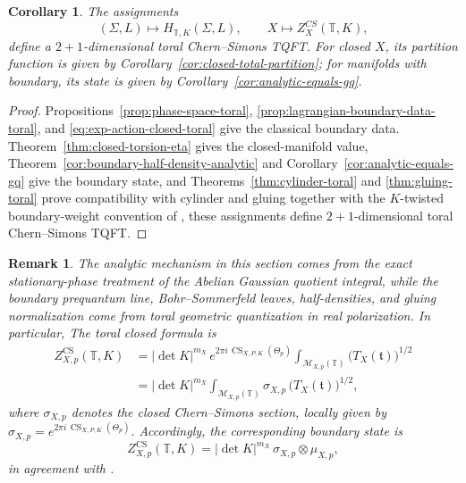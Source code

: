 \documentclass[12pt]{amsart}
\numberwithin{equation}{section}
\newtheorem{corollary}[theorem]{Corollary}
\newtheorem*{remark}{Remark}
\begin{document}
\begin{corollary}
The assignments
\[
(\Sigma, L)\longmapsto H_{\mathbb T,K}(\Sigma,L), \qquad
X\longmapsto Z^{CS}_X(\mathbb T,K),
\]
define a \(2+1\)-dimensional toral Chern--Simons TQFT. For closed \(X\), its partition
function is given by Corollary~\ref{cor:closed-total-partition}; for manifolds with boundary, its state is given by
Corollary~\ref{cor:analytic-equals-gq}.
\end{corollary}

\begin{proof}
Propositions~\ref{prop:phase-space-toral}, \ref{prop:lagrangian-boundary-data-toral}, and \ref{eq:exp-action-closed-toral} give the classical boundary data. Theorem~\ref{thm:closed-torsion-eta} gives the
closed-manifold value, Theorem~\ref{cor:boundary-half-density-analytic} and Corollary~\ref{cor:analytic-equals-gq} give the boundary state, and
Theorems~\ref{thm:cylinder-toral} and \ref{thm:gluing-toral} prove compatibility with cylinder and gluing together with the $K$-twisted boundary-weight convention of \cite{Galviz2}, these assignments define $2+1$-dimensional toral Chern–Simons TQFT.
\end{proof}
\begin{remark}
The analytic mechanism in this section comes from the exact stationary-phase treatment of
the Abelian Gaussian quotient integral, while the boundary prequantum line,
Bohr--Sommerfeld leaves, half-densities, and gluing normalization come from toral geometric
quantization in real polarization. In particular, The toral closed formula is
\[
\begin{aligned}
Z^{\mathrm{CS}}_{X,p}(\mathbb T,K)
&=
|\det K|^{m_X}\,
e^{2\pi i\,\operatorname{CS}_{X,P,K}(\Theta_p)}
\int_{\mathcal M_{X,p}(\mathbb T)}
\bigl(T_X(\mathfrak t)\bigr)^{1/2} \\
&=
|\det K|^{m_X}
\int_{\mathcal M_{X,p}(\mathbb T)}
\sigma_{X,p}\,\bigl(T_X(\mathfrak t)\bigr)^{1/2},
\end{aligned}
\]
where \(\sigma_{X,p}\) denotes the closed Chern--Simons section, locally given by $\sigma_{X,p}=e^{2\pi i\,\operatorname{CS}_{X,P,K}(\Theta_p)}.$ Accordingly, the corresponding boundary state is
\[
Z^{\mathrm{CS}}_{X,p}(\mathbb T,K)
=
|\det K|^{m_X}\,\sigma_{X,p}\otimes \mu_{X,p},
\]
in agreement with \cite{Galviz2}.
\end{remark}


\renewcommand{\refname}{References}

\end{document}
